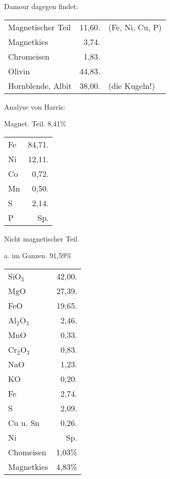 \documentclass[a4paper, 11pt, oneside]{article}
\begin{document}
Damour dagegen findet:
\begin{table}[H]
    \centering
    \begin{tabular}{l r l}
        Magnetischer Teil & 11,60. & (Fe, Ni, Cu, P)  \\
        Magnetkies & 3,74. & \\
        Chromeisen & 1,83. & \\
        Olivin & 44,83. & \\
        Hornblende, Albit & 38,00. & (die Kugeln!) \\
    \end{tabular}
\end{table}

Analyse von Harris:
\begin{center}
Magnet. Teil. 8,41\%
\end{center}
\begin{table}[H]
    \centering
    \begin{tabular}{l r}
        Fe & 84,71. \\
        Ni & 12,11. \\
        Co & 0,72. \\
        Mn & 0,50. \\
        S & 2,14. \\
        P & Sp. \\
    \end{tabular}
\end{table}

\begin{center}
Nicht magnetischer Teil.
\end{center}

\begin{center}
a. im Ganzen. 91,59\%
\end{center}

\begin{table}[H]
    \centering
    \begin{tabular}{l r}
        SiO$_{3}$ & 42,00. \\
        MgO & 27,39. \\
        FeO & 19,65. \\
        Al$_{2}$O$_{3}$ & 2,46. \\
        MnO & 0,33. \\
        Cr$_{2}$O$_{3}$ & 0,83. \\
        NaO & 1,23. \\
        KO & 0,20. \\
        Fe & 2,74. \\
        S & 2,09. \\
        Cu u. Sn  & 0,26. \\
        Ni & Sp. \\
        Chomeisen & 1,03\% \\
        Magnetkies & 4,83\% \\
    \end{tabular}
\end{table}
\end{document}
